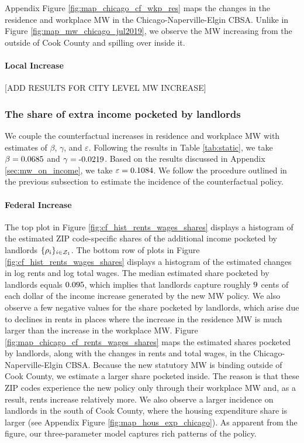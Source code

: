 Appendix Figure \ref{fig:map_chicago_cf_wkp_res} maps the changes in the 
residence and workplace MW in the Chicago-Naperville-Elgin CBSA.
Unlike in Figure \ref{fig:map_mw_chicago_jul2019}, we observe the MW increasing 
from the outside of Cook County and spilling over inside it.

\paragraph{Local Increase}

[ADD RESULTS FOR CITY LEVEL MW INCREASE]

\subsubsection*{The share of extra income pocketed by landlords}
\label{sec:cf_rents_and_wage_changes}

We couple the counterfactual increases in residence and workplace MW with 
estimates of $\beta$, $\gamma$, and $\varepsilon$.
Following the results in Table \ref{tab:static}, we take 
$\beta = \textnormal{0.0685}$ and 
$\gamma = \textnormal{-0.0219}$.
Based on the results discussed in Appendix \ref{sec:mw_on_income}, we take
$\varepsilon = \textnormal{0.1084}$.
We follow the procedure outlined in the previous subsection to estimate the 
incidence of the counterfactual policy.

\paragraph{Federal Increase}

The top plot in Figure \ref{fig:cf_hist_rents_wages_shares} displays a histogram 
of the estimated ZIP code-specific shares of the additional income pocketed by 
landlords $\{\rho_i\}_{i\in\mathcal{Z}_1}$.
The bottom row of plots in Figure \ref{fig:cf_hist_rents_wages_shares} displays 
a histogram of the estimated changes in log rents and log total wages.
The median estimated share pocketed by landlords equals $\textnormal{0.095}$, 
which implies that landlords capture roughly $\textnormal{9}$ cents of 
each dollar of the income increase generated by the new MW policy.
We also observe a few negative values for the share pocketed by landlords, which
arise due to declines in rents in places where the increase in the residence MW
is much larger than the increase in the workplace MW.
Figure \ref{fig:map_chicago_cf_rents_wages_shares} maps the estimated shares 
pocketed by landlords, along with the changes in rents and total wages, in the 
Chicago-Naperville-Elgin CBSA.
Because the new statutory MW is binding outside of Cook County, we estimate 
a larger share pocketed inside.
The reason is that these ZIP codes experience the new policy only through
their workplace MW and, as a result, rents increase relatively more.
We also observe a larger incidence on landlords in the south of Cook County,
where the housing expenditure share is larger 
(see Appendix Figure \ref{fig:map_hous_exp_chicago}).
As apparent from the figure, our three-parameter model captures rich patterns
of the policy.

